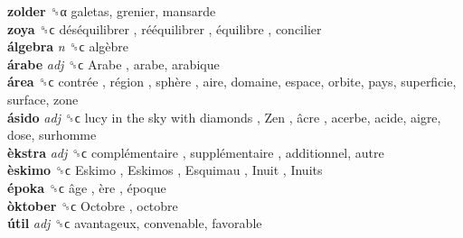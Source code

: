 \textbf{zolder} ␝α  galetas, grenier, mansarde  \\
\textbf{zoya} ␝ϲ   déséquilibrer ,  rééquilibrer ,  équilibre , concilier  \\
\textbf{álgebra} \emph{n}  ␝ϲ   algèbre   \\
\textbf{árabe} \emph{adj}  ␝ϲ   Arabe , arabe, arabique  \\
\textbf{área} ␝ϲ   contrée ,  région ,  sphère , aire, domaine, espace, orbite, pays, superficie, surface, zone  \\
\textbf{ásido} \emph{adj}  ␝ϲ   lucy in the sky with diamonds ,  Zen ,  âcre , acerbe, acide, aigre, dose, surhomme  \\
\textbf{èkstra} \emph{adj}  ␝ϲ   complémentaire ,  supplémentaire , additionnel, autre  \\
\textbf{èskimo} ␝ϲ   Eskimo ,  Eskimos ,  Esquimau ,  Inuit ,  Inuits   \\
\textbf{époka} ␝ϲ   âge ,  ère ,  époque   \\
\textbf{òktober} ␝ϲ   Octobre , octobre  \\
\textbf{útil} \emph{adj}  ␝ϲ  avantageux, convenable, favorable  \\
